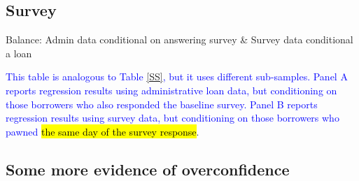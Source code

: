 \subsection{Survey}



\begin{table}[H]
\caption{Balance: Admin data conditional on answering survey \& Survey data conditional a loan}
\label{SS_cond_survet}
\begin{center}
\scriptsize{}
\end{center}
\scriptsize
\textcolor{blue}{This table is analogous to Table \ref{SS}, but it uses different sub-samples. Panel A reports regression results using administrative loan data, but conditioning on those borrowers who also responded the baseline survey. Panel B reports regression results using survey data, but conditioning on those borrowers who pawned \hl{the same day of the survey response}}.
\end{table}


\newpage
\subsection{Some more evidence of overconfidence}

